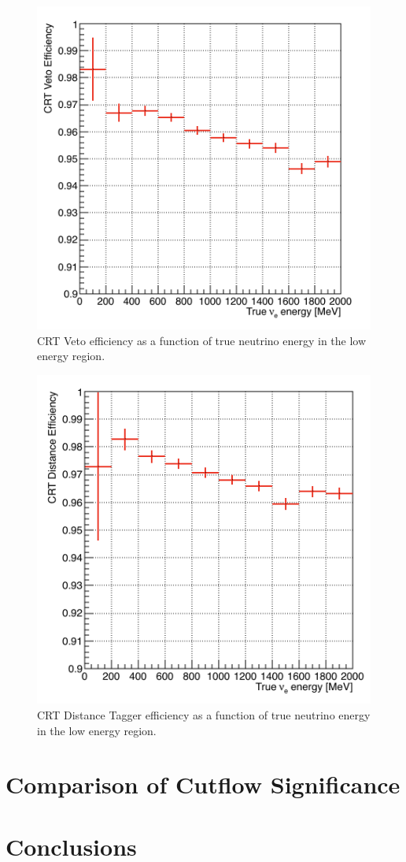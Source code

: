 \begin{figure}[h!]
\centering
\includegraphics[scale=0.4]{images/CRTVetoEfficiency}
\caption{CRT Veto efficiency as a function of true neutrino energy in the low energy region.}
\label{fig:VetoE}
\end{figure}

\begin{figure}[h!]
\centering
\includegraphics[scale=0.4]{images/CRTDistanceEfficiency}
\caption{CRT Distance Tagger efficiency as a function of true neutrino energy in the low energy region.}
\label{fig:DistanceE}
\end{figure}


\section{Comparison of Cutflow Significance}\label{sec:Significance}
\section{Conclusions}\label{sec:Conclusions}